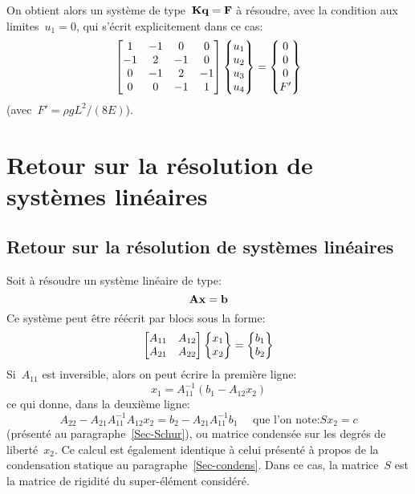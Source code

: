 %
On obtient alors un système de type~$\MM{K}\VV{q}=\VV{F}$ à résoudre, avec la condition aux limites~$u_1=0$, qui s'écrit explicitement dans ce cas:
\begin{equation}
\MM*{1 & -1 & 0 & 0 \\ -1 & 2 & -1 & 0 \\ 0 & -1 & 2 & -1\\ 0&0&-1&1}
\VV*{u_1\\u_2\\u_3\\u_4}
=
\VV*{0\\0\\0\\F'}
\end{equation}
(avec~$F'=\rho g L^2/(8E)$).

\medskipvm
\ifVersionAvecExemplesSepares
  \section{Retour sur la résolution de systèmes linéaires}
\else
  \subsection{Retour sur la résolution de systèmes linéaires}
\fi
Soit à résoudre un système linéaire de type:
\begin{equation}\label{Eq-lin} \MM{A}\VV{x}=\VV{b} \end{equation}
Ce système peut être réécrit par blocs sous la forme:
\begin{equation} 
\MM*{A_{11} & A_{12}\\ A_{21} & A_{22}}
\VV*{x_1 \\ x_2} =
\VV*{b_1\\ b_2}
\end{equation}
\medskipvm
Si~$A_{11}$ est inversible, alors on peut écrire la première ligne:
\begin{equation}
x_1 = A_{11}^{-1}\left( b_1-A_{12}x_2 \right)
\end{equation}
ce qui donne, dans la deuxième ligne:
\begin{equation}
A_{22} - A_{21}A_{11}^{-1}A_{12}x_2 = b_2 - A_{21}A_{11}^{-1}b_1
\quad \text{ que l'on note:}
S x_2=c
\end{equation}
(présenté au paragraphe~\ref{Sec-Schur}), ou matrice condensée sur les degrés de liberté~$x_2$.
Ce calcul est également identique à celui présenté à propos de la condensation statique au paragraphe~\ref{Sec-condens}.
Dans ce cas, la matrice~$S$ est la matrice de rigidité du super-élément considéré.


